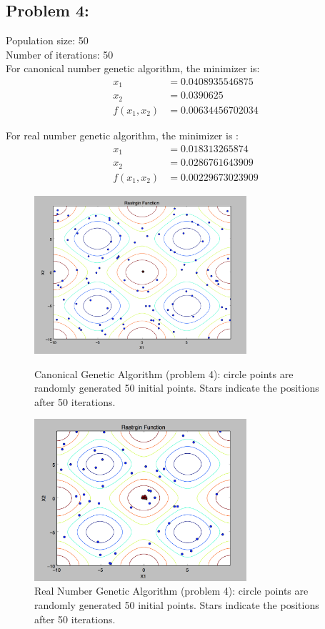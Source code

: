 \documentclass{article}
\begin{document}
\subsection*{{Problem 4: }}

Population size:  50  \\
Number of iterations:  50 \\ 
For canonical number genetic algorithm, the minimizer is: \\
\begin{align*}
x_1 & = 0.0408935546875 \\
x_2 & = 0.0390625  \\
f(x_1,x_2)  & = 0.00634456702034
\end{align*}

For real number genetic algorithm, the minimizer is : \\
\begin{align*} 
x_1 & = 0.018313265874 \\
x_2 & = 0.0286761643909 \\
f(x_1, x_2) & = 0.00229673023909
\end{align*} 

\begin{figure} [h]
\includegraphics[width=0.7\textwidth]{GA_canonical}
\centering
\caption{Canonical Genetic Algorithm (problem 4): circle points are randomly generated 50 initial points. Stars indicate the positions after 50 iterations. }

\includegraphics[width=0.7\textwidth]{GA_real_number}
\centering
\caption{Real Number Genetic Algorithm (problem 4): circle points are randomly generated 50 initial points. Stars indicate the positions after 50 iterations. }

\end{figure}
\end{document}
